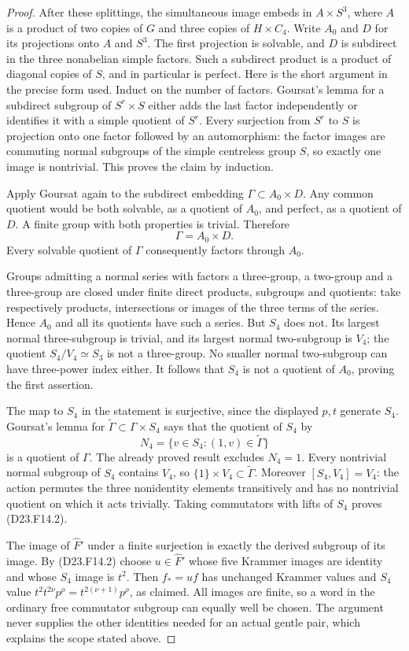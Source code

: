 \begin{proof}
After these splittings, the simultaneous image embeds
in $A\times S^3$, where $A$ is a product of two copies
of $G$ and three copies of $H\times C_4$.
Write $A_0$ and $D$ for its projections onto $A$ and
$S^3$.  The first projection is solvable, and $D$ is
subdirect in the three nonabelian simple factors.
Such a subdirect product is a product of diagonal
copies of $S$, and in particular is perfect.  Here is
the short argument in the precise form used.  Induct
on the number of factors.  Goursat's lemma for a
subdirect subgroup of $S^r\times S$ either adds the
last factor independently or identifies it with a
simple quotient of $S^r$.  Every surjection from
$S^r$ to $S$ is projection onto one factor followed
by an automorphism: the factor images are commuting
normal subgroups of the simple centreless group $S$,
so exactly one image is nontrivial.  This proves the
claim by induction.

Apply Goursat again to the subdirect embedding
$\Gamma\subset A_0\times D$.  Any common quotient
would be both solvable, as a quotient of $A_0$, and
perfect, as a quotient of $D$.  A finite group with
both properties is trivial.  Therefore
\[
 \Gamma=A_0\times D.
\]
Every solvable quotient of $\Gamma$ consequently
factors through $A_0$.

Groups admitting a normal series with factors a
three-group, a two-group and a three-group are closed
under finite direct products, subgroups and quotients:
take respectively products, intersections or images
of the three terms of the series.  Hence $A_0$ and
all its quotients have such a series.  But $S_4$ does
not.  Its largest normal three-subgroup is trivial,
and its largest normal two-subgroup is $V_4$; the
quotient $S_4/V_4\simeq S_3$ is not a three-group.
No smaller normal two-subgroup can have three-power
index either.  It follows that $S_4$ is not a quotient
of $A_0$, proving the first assertion.

The map to $S_4$ in the statement is surjective, since
the displayed $p,t$ generate $S_4$.  Goursat's lemma
for $\widetilde\Gamma\subset\Gamma\times S_4$ says
that the quotient of $S_4$ by
\[
 N_4=\{v\in S_4:(1,v)\in\widetilde\Gamma\}
\]
is a quotient of $\Gamma$.  The already proved result
excludes $N_4=1$.  Every nontrivial normal subgroup
of $S_4$ contains $V_4$, so
$\{1\}\times V_4\subset\widetilde\Gamma$.
Moreover $[S_4,V_4]=V_4$: the action permutes the
three nonidentity elements transitively and has no
nontrivial quotient on which it acts trivially.
Taking commutators with lifts of $S_4$ proves
(D23.F14.2).

The image of $\widehat F'$ under a finite surjection
is exactly the derived subgroup of its image.
By (D23.F14.2) choose $u\in\widehat F'$ whose five
Krammer images are identity and whose $S_4$ image
is $t^2$.  Then $f_*=uf$ has unchanged Krammer
values and $S_4$ value
$t^2t^{2\nu}p^\rho=t^{2(\nu+1)}p^\rho$, as claimed.
All images are finite, so a word in the ordinary free
commutator subgroup can equally well be chosen.
The argument never supplies the other identities
needed for an actual gentle pair, which explains the
scope stated above.
\end{proof}

